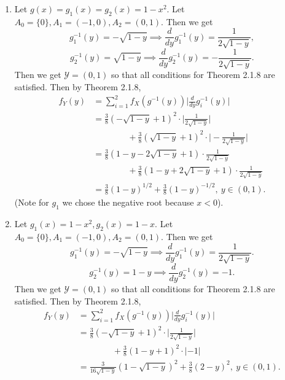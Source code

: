 \documentclass{article}
\begin{document}
\begin{enumerate}
\begin{enumerate}
        \item Let $g(x) = g_1(x) = g_2(x) = 1 - x^2$. Let $A_0 = \{0\}, A_1 = (-1, 0), A_2 = (0, 1)$. Then we get 
        \[ g_{1}^{-1}(y) = -\sqrt{1 - y} \implies \frac{d}{dy}g_{1}^{-1}(y) = \frac{1}{2\sqrt{1 - y}}, \]
        \[ g_{2}^{-1}(y) = \sqrt{1 - y} \implies \frac{d}{dy}g_{2}^{-1}(y) = -\frac{1}{2\sqrt{1 - y}}. \]
        Then we get $\mathcal{Y} = (0, 1)$ so that all conditions for Theorem 2.1.8 are satisfied. Then by 
        Theorem 2.1.8, 
        \begin{align*}
            f_{Y}(y)
            &= \sum_{i = 1}^{2} f_{X}(g^{-1}(y)) \Big| \frac{d}{dy}g_{i}^{-1}(y) \Big| \\
            &= \frac{3}{8}(-\sqrt{1 - y} + 1)^2 \cdot \Big| \frac{1}{2\sqrt{1 - y}} \Big| \\
            &\qquad \qquad + \frac{3}{8}(\sqrt{1 - y} + 1)^2 \cdot \Big| -\frac{1}{2\sqrt{1 - y}} \Big| \\
            &= \frac{3}{8} (1 - y - 2\sqrt{1 - y} + 1) \cdot \frac{1}{2\sqrt{1 - y}} \\
            &\qquad \qquad + \frac{3}{8} ( 1 - y + 2\sqrt{1 - y} + 1) \cdot \frac{1}{2\sqrt{1 - y}} \\
            &= \frac{3}{8}(1 - y)^{1/2} + \frac{3}{8}(1 - y)^{-1/2}, \ y \in (0, 1).
        \end{align*}
        (Note for $g_1$ we chose the negative root because $x < 0$).

        \item Let $g_1(x) = 1 - x^2, g_2(x) = 1 - x$. Let $A_0 = \{0\}, A_1 = (-1, 0), A_2 = (0, 1)$. Then we get 
        \[ g_{1}^{-1}(y) = -\sqrt{1 - y} \implies \frac{d}{dy}g_{1}^{-1}(y) = \frac{1}{2\sqrt{1 - y}}. \]
        \[ g_{2}^{-1}(y) = 1 - y \implies \frac{d}{dy}g_{2}^{-1}(y) = -1. \]
        Then we get $\mathcal{Y} = (0, 1)$ so that all conditions for Theorem 2.1.8 are satisfied. Then by 
        Theorem 2.1.8, 
        \begin{align*}
            f_{Y}(y)
            &= \sum_{i = 1}^{2} f_{X}(g^{-1}(y)) \Big| \frac{d}{dy}g_{i}^{-1}(y) \Big| \\
            &= \frac{3}{8}(-\sqrt{1 - y} + 1)^2 \cdot \Big| \frac{1}{2\sqrt{1 - y}} \Big| \\
            &\qquad \qquad + \frac{3}{8} (1 - y + 1)^2 \cdot |-1| \\
            &= \frac{3}{16\sqrt{1 - y}}(1 - \sqrt{1 - y})^2 + \frac{3}{8}(2 - y)^2, \ y \in (0, 1).
        \end{align*}
    \end{enumerate}


\end{enumerate}
\end{document}
